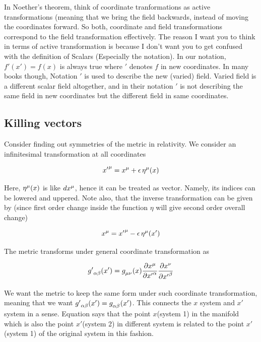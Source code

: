 \documentclass{report}
\begin{document}
\noindent In Noether's theorem, think of coordinate tranformations as active transformations (meaning that we bring the field backwards, instead of moving the coordinates forward. So both, coordinate and field transformations correspond to the field transformation effectively. The reason I want you to think in terms of active transformation is because I don't want you to get confused with the definition of Scalars (Especially the notation). In our notation, $f'(x') = f(x)$ is always true where $'$ denotes $f$ in new coordinates. In many books though, Notation $'$ is  used to describe the new (varied) field. Varied field is a different scalar field altogether, and in their notation $'$ is not describing the same field in new coordinates but the different field in same coordinates.

\subsection{Killing vectors}
\label{sec:killing}

Consider finding out symmetries of the metric in relativity. We consider an infinitesimal transformation at all coordinates

$${x'}\indices{^\mu} = x\indices{^\mu} + \epsilon \, \eta\indices{^\mu}(x)$$

\noindent Here, $\eta\indices{^\mu}(x)$ is like $dx\indices{^\mu}$, hence it can be treated as vector. Namely, its indices can be lowered and uppered. Note also, that the inverse transformation can be given by (since first order change inside the function $\eta$ will give second order overall change)


$$x\indices{^\mu} = {x'}\indices{^\mu} - \epsilon \, \eta\indices{^\mu}(x')$$

\noindent The metric transforms under general coordinate transformation as 

$${g'}\indices{_\alpha_ \beta}(x') = g\indices{_\mu _\nu}(x)\frac{\partial x\indices{^\mu}}{\partial {x'}\indices{^\alpha}} \frac{\partial x\indices{^\nu}}{\partial {x'}\indices{^\beta}}$$

\noindent We want the metric to keep the same form under such coordinate transformation, meaning that we want ${g'}\indices{_\alpha_ \beta}(x') = g\indices{_\alpha_ \beta}(x')$. This connects the $x$ system and $x'$ system in a sense. Equation says that the point $x$(system 1) in the manifold which is also the point $x'$(system 2) in different system is related to the point $x'$(system 1) of the original system in this fashion. 
\end{document}
